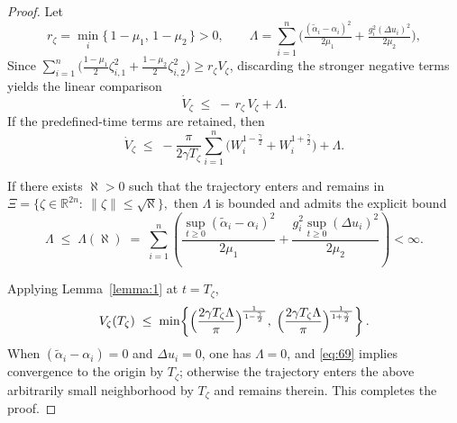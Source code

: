 \documentclass[pdflatex,sn-mathphys-num]{sn-jnl}%
\theoremstyle{thmstyleone}%
\theoremstyle{thmstyletwo}%
\theoremstyle{thmstylethree}%
\begin{document}
\begin{proof}
Let
\[
  r_\zeta = \min_{i}\{\,1-\mu_{1},\,1-\mu_{2}\,\}>0,\qquad
  \Lambda  = \sum_{i=1}^{n}\Big(
  \tfrac{(\tilde\alpha_i-\alpha_i)^{2}}{2\mu_{1}}
  +\tfrac{g_i^{2}(\Delta u_i)^{2}}{2\mu_{2}}\Big),
\]
Since
\(
  \sum_{i=1}^{n}\big(\tfrac{1-\mu_{1}}{2}\zeta_{i,1}^{2}
  +\tfrac{1-\mu_{2}}{2}\zeta_{i,2}^{2}\big)
  \ge r_\zeta V_\zeta
\),
discarding the stronger negative terms yields the linear comparison
\begin{equation}\label{eq:68}
  \dot V_{\zeta}\;\le\; -\, r_\zeta\, V_\zeta + \Lambda .
\end{equation}
If the predefined-time terms are retained, then
\begin{equation}\label{eq:69}
  \dot V_{\zeta}
  \;\le\;
  -\frac{\pi}{2\gamma T_{\zeta}}
  \sum_{i=1}^{n}\Big( W_i^{1-\frac{\gamma}{2}}+W_i^{1+\frac{\gamma}{2}} \Big)
  +\Lambda.
\end{equation}

If there exists $\aleph>0$ such that the trajectory enters and remains in
	\(
	  \Xi=\{\zeta\in\mathbb R^{2n}:\ \|\zeta\|\le \sqrt{\aleph}\},
	\)
	then $\Lambda$ is bounded and admits the explicit bound
\begin{equation}\label{eq:70}
  \Lambda \;\le\; \Lambda(\aleph)\;=\;
  \sum_{i=1}^{n}\left(
  \frac{\sup_{t\ge 0}(\tilde\alpha_i-\alpha_i)^2}{2\mu_{1}}
  +\frac{g_i^{2}\sup_{t\ge 0}(\Delta u_i)^2}{2\mu_{2}}
  \right)\!<\infty .
\end{equation}

Applying Lemma~\ref{lemma:1} at $t=T_\zeta$,
\begin{equation}\label{eq:71}
  V_\zeta(T_\zeta) \;\le\;
  \min\!\left\{
    \Bigl(\frac{2\gamma T_{\zeta}\Lambda}{\pi}\Bigr)^{\!\frac{1}{\,1-\frac{\gamma}{2}\,}},
    \;
    \Bigl(\frac{2\gamma T_{\zeta}\Lambda}{\pi}\Bigr)^{\!\frac{1}{\,1+\frac{\gamma}{2}\,}}
  \right\}.
\end{equation}
When $(\tilde\alpha_i-\alpha_i)=0$ and $\Delta u_i=0$, one has $\Lambda=0$, and \cref{eq:69} implies convergence to the origin by $T_\zeta$; otherwise the trajectory enters the above arbitrarily small neighborhood by $T_\zeta$ and remains therein. This completes the proof.
\end{proof}
\end{document}
